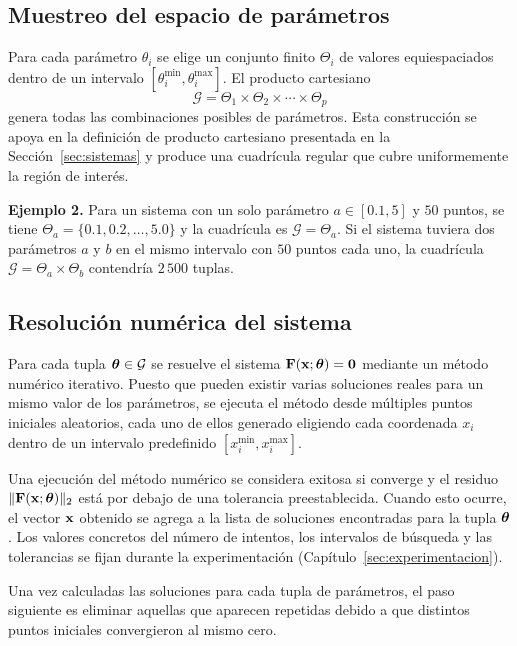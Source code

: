 \subsection{Muestreo del espacio de parámetros}

Para cada parámetro \(\theta_i\) se elige un conjunto finito \(\Theta_i\) de valores equiespaciados dentro de un intervalo \([\theta_i^{\min}, \theta_i^{\max}]\). El producto cartesiano \[ \mathcal{G} = \Theta_1 \times \Theta_2 \times \cdots \times \Theta_p \] genera todas las combinaciones posibles de parámetros. Esta construcción se apoya en la definición de producto cartesiano presentada en la Sección~\ref{sec:sistemas} y produce una cuadrícula regular que cubre uniformemente la región de interés.

\bigskip \noindent\textbf{Ejemplo 2.} Para un sistema con un solo parámetro \(a \in [0.1, 5]\) y \(50\) puntos, se tiene \(\Theta_a = \{0.1, 0.2, \dots, 5.0\}\) y la cuadrícula es \(\mathcal{G} = \Theta_a\). Si el sistema tuviera dos parámetros \(a\) y \(b\) en el mismo intervalo con \(50\) puntos cada uno, la cuadrícula \(\mathcal{G} = \Theta_a \times \Theta_b\) contendría \(2\,500\) tuplas.

\subsection{Resolución numérica del sistema}

Para cada tupla \(\boldsymbol{\theta} \in \mathcal{G}\) se resuelve el sistema \(\mathbf{F}(\mathbf{x}; \boldsymbol{\theta}) = \mathbf{0}\) mediante un método numérico iterativo. Puesto que pueden existir varias soluciones reales para un mismo valor de los parámetros, se ejecuta el método desde múltiples puntos iniciales aleatorios, cada uno de ellos generado eligiendo cada coordenada \(x_i\) dentro de un intervalo predefinido \([x_i^{\min}, x_i^{\max}]\).

Una ejecución del método numérico se considera exitosa si converge y el residuo \(\|\mathbf{F}(\mathbf{x}; \boldsymbol{\theta})\|_2\) está por debajo de una tolerancia preestablecida. Cuando esto ocurre, el vector \(\mathbf{x}\) obtenido se agrega a la lista de soluciones encontradas para la tupla \(\boldsymbol{\theta}\). Los valores concretos del número de intentos, los intervalos de búsqueda y las tolerancias se fijan durante la experimentación (Capítulo~\ref{sec:experimentacion}).

Una vez calculadas las soluciones para cada tupla de parámetros, el paso siguiente es eliminar aquellas que aparecen repetidas debido a que distintos puntos iniciales convergieron al mismo cero.


